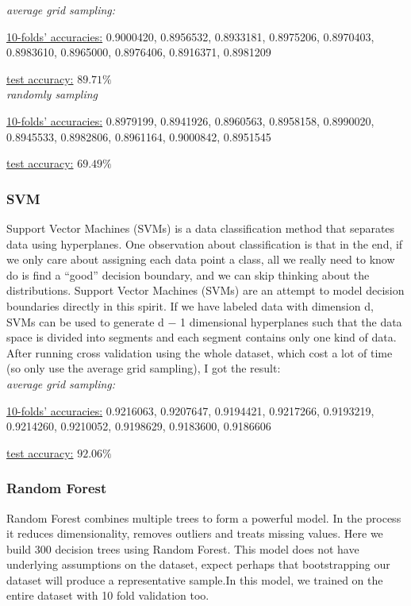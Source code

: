 \documentclass[12pt]{extarticle}
\begin{document}
\cdot \emph{average grid sampling:}

\underline{10-folds’ accuracies:}
0.9000420, 0.8956532, 0.8933181, 0.8975206, 0.8970403, 0.8983610, 0.8965000, 0.8976406,
0.8916371, 0.8981209


\underline{test accuracy:}  $89.71\%$\\

\cdot \emph{randomly sampling}

\underline{10-folds’ accuracies:}
0.8979199, 0.8941926, 0.8960563, 0.8958158, 0.8990020, 0.8945533, 0.8982806, 0.8961164, 0.9000842, 0.8951545


\underline{test accuracy:}  $ 69.49\%$

\subsubsection{SVM}
Support Vector Machines (SVMs) is a data classification method that separates data using hyperplanes. One observation about classification is that in the end, if we only care about assigning each data point a class, all we really need to know do is find a “good” decision boundary, and we can skip thinking about the distributions. Support Vector Machines (SVMs) are an attempt to model decision boundaries directly in this spirit.
If we have labeled data with dimension d, SVMs can be used to generate d − 1 dimensional hyperplanes such that the data space is divided into segments and each segment contains only one kind of data.
After running cross validation using the whole dataset, which cost a lot of time
(so only use the average grid sampling), I got the result:\\
\cdot \emph{average grid sampling:}



\underline{10-folds’ accuracies:}
0.9216063, 0.9207647, 0.9194421, 0.9217266, 0.9193219, 0.9214260,
0.9210052, 0.9198629, 0.9183600, 0.9186606



\underline{test accuracy:}  $92.06\%$

\subsubsection{Random Forest}
Random Forest combines multiple trees to form a powerful model. In the process it reduces dimensionality, removes outliers and treats missing values. Here we build 300 decision trees using Random Forest. This model does not have underlying assumptions on the dataset, expect perhaps that bootstrapping our dataset will produce a representative sample.In this model, we trained on the entire dataset with 10 fold validation too.
\end{document}
